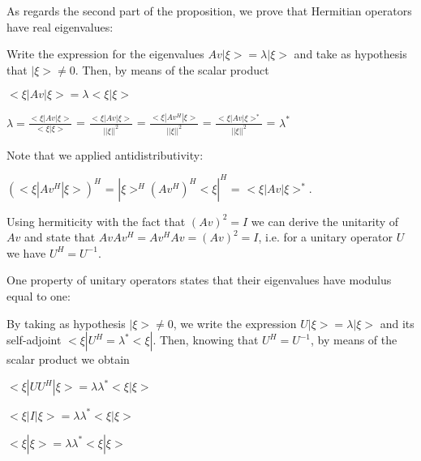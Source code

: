 \documentclass[12pt]{report}
\begin{document}
	\begin{minipage}{1\textwidth}
		
		
		As regards the second part of the proposition, we prove that Hermitian operators have real eigenvalues: \newline
		
		Write the expression for the eigenvalues $Av |\xi> = \lambda |\xi>$ and take as hypothesis that $|\xi> \neq 0$. Then, by means of the scalar product\newline
		
		\begin{center}
			$<\xi|Av|\xi> = \lambda <\xi |\xi>$\newline
			
			$\lambda = \frac {<\xi|Av|\xi>}{<\xi |\xi>}$ = $\frac {<\xi|Av|\xi>}{||\xi||^2}$ = $\frac {<\xi|Av^H|\xi>}{||\xi||^2}$ = $\frac {<\xi|Av|\xi>^*}{||\xi||^2}$ = $\lambda^*$\newline
		\end{center}
		
		Note that we applied antidistributivity: \newline
		
		\begin{center}
			$(<\xi|Av^H|\xi>)^H$ = $|\xi>^H (Av^H)^H <\xi|^H$ = $<\xi|Av|\xi>^*$. \newline
		\end{center}
		
		Using hermiticity with the fact that $(Av)^2=I$ we can derive the unitarity of $Av$ and state that $Av Av^H = Av^H Av = (Av)^2 = I$, i.e. for a unitary operator $U$ we have $U^H=U^{-1}$. \newline
		
		One property of unitary operators states that their eigenvalues have modulus equal to one:\newline 
		
		
		By taking as hypothesis $|\xi> \neq 0$, we write the expression $U |\xi> = \lambda |\xi>$ and its self-adjoint $<\xi| U^H = \lambda^* <\xi|$. Then, knowing that $U^H=U^{-1}$, by means of the scalar product we obtain \newline
		
		\begin{center}
			$<\xi|U U^H|\xi> = \lambda \lambda^* <\xi |\xi>$\newline
			
			$<\xi|I|\xi> = \lambda \lambda^* <\xi |\xi>$\newline
			
			$<\xi|\xi> = \lambda \lambda^* <\xi |\xi>$\newline
		\end{center}
		

\end{minipage}
\end{document}

